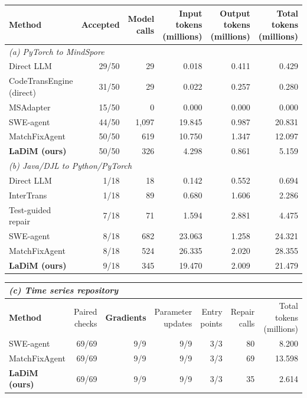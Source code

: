\begin{tabular*}{\linewidth}{@{\extracolsep{\fill}}lrrrrr@{}}
\toprule
\textbf{Method} & \textbf{Accepted} & \thead{Model\\calls} & \thead{Input tokens\\(millions)} & \thead{Output tokens\\(millions)} & \thead{Total tokens\\(millions)} \\
\midrule
\multicolumn{6}{l}{\textit{(a) PyTorch to MindSpore}} \\
Direct LLM & 29/50 & 29 & 0.018 & 0.411 & 0.429 \\
CodeTransEngine (direct) & 31/50 & 29 & 0.022 & 0.257 & 0.280 \\
MSAdapter & 15/50 & 0 & 0.000 & 0.000 & 0.000 \\
SWE-agent & 44/50 & 1,097 & 19.845 & 0.987 & 20.831 \\
MatchFixAgent & 50/50 & 619 & 10.750 & 1.347 & 12.097 \\
\textbf{LaDiM (ours)} & 50/50 & 326 & 4.298 & 0.861 & 5.159 \\
\midrule
\multicolumn{6}{l}{\textit{(b) Java/DJL to Python/PyTorch}} \\
Direct LLM & 1/18 & 18 & 0.142 & 0.552 & 0.694 \\
InterTrans & 1/18 & 89 & 0.680 & 1.606 & 2.286 \\
Test-guided repair & 7/18 & 71 & 1.594 & 2.881 & 4.475 \\
SWE-agent & 8/18 & 682 & 23.063 & 1.258 & 24.321 \\
MatchFixAgent & 8/18 & 524 & 26.335 & 2.020 & 28.355 \\
\textbf{LaDiM (ours)} & 9/18 & 345 & 19.470 & 2.009 & 21.479 \\
\bottomrule
\end{tabular*}
\par\vspace{5pt}
\begin{tabular*}{\linewidth}{@{\extracolsep{\fill}}lrrrrrr@{}}
\toprule
\multicolumn{7}{l}{\textit{(c) Time series repository}} \\
\midrule
\textbf{Method} & \thead{Paired\\checks} & \textbf{Gradients} & \thead{Parameter\\updates} & \thead{Entry\\points} & \thead{Repair\\calls} & \thead{Total tokens\\(millions)} \\
\midrule
SWE-agent & 69/69 & 9/9 & 9/9 & 3/3 & 80 & 8.200 \\
MatchFixAgent & 69/69 & 9/9 & 9/9 & 3/3 & 69 & 13.598 \\
\textbf{LaDiM (ours)} & 69/69 & 9/9 & 9/9 & 3/3 & 35 & 2.614 \\
\bottomrule
\end{tabular*}
